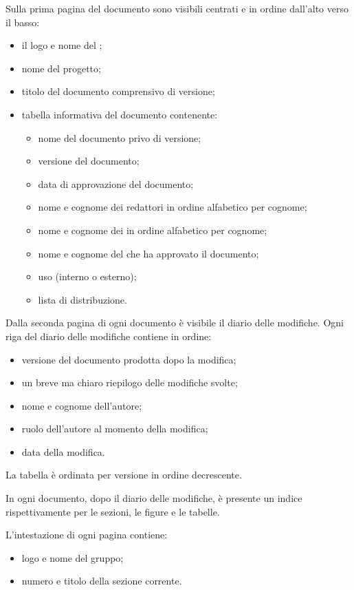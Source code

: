 \documentclass[a4paper, titlepage]{article}
\begin{document}
Sulla prima pagina del documento sono visibili centrati e in ordine dall'alto verso il basso:
\begin{itemize}
	\item il logo e nome del ;
	\item nome del progetto;
	\item titolo del documento comprensivo di versione;
	\item tabella informativa del documento contenente:
	\begin{itemize}
		\item nome del documento privo di versione;
		\item versione del documento;
		\item data di approvazione del documento;
		\item nome e cognome dei redattori in ordine alfabetico per cognome;
		\item nome e cognome dei  in ordine alfabetico per cognome;
		\item nome e cognome del  che ha approvato il documento;
		\item uso (interno o esterno);
		\item lista di distribuzione.
	\end{itemize}
\end{itemize}

Dalla seconda pagina di ogni documento è visibile il diario delle modifiche. Ogni riga del diario delle modifiche contiene in ordine:
\begin{itemize}
	\item versione del documento prodotta dopo la modifica;
	\item un breve ma chiaro riepilogo delle modifiche svolte;
	\item nome e cognome dell'autore;
	\item ruolo dell'autore al momento della modifica;
	\item data della modifica.
\end{itemize}
La tabella è ordinata per versione in ordine decrescente.

In ogni documento, dopo il diario delle modifiche, è presente un indice rispettivamente per le sezioni, le figure e le tabelle.

L'intestazione di ogni pagina contiene:
\begin{itemize}
	\item logo e nome del gruppo;
	\item numero e titolo della sezione corrente.
\end{itemize}
\end{document}
